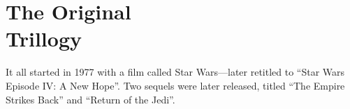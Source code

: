 
\part[The Original Trillogy]{The Original\\Trillogy}
	\label{part:original-trillogy}%



It all started in 1977 with a film called Star Wars---later retitled to ``Star Wars Episode IV: A New Hope''.  Two sequels were later released, titled ``The Empire Strikes Back'' and ``Return of the Jedi''.

